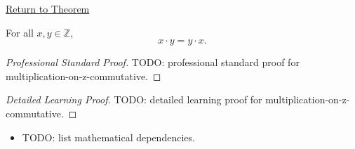 \newpage
{}
\label{prf:multiplication-on-z-commutative}

\begin{remark*}[Return]
\hyperref[thm:multiplication-on-z-commutative]{Return to Theorem}
\end{remark*}

\begin{theorem*}
For all $x,y\in\mathbb{Z}$,
\[
x\cdot y=y\cdot x.
\]
\end{theorem*}

\begin{proof}[Professional Standard Proof]
\LRAProofBodyStart
TODO: professional standard proof for multiplication-on-z-commutative.
\end{proof}

\begin{proof}[Detailed Learning Proof]
\LRAProofBodyStart
TODO: detailed learning proof for multiplication-on-z-commutative.
\end{proof}

\begin{remark*}
\end{remark*}

\begin{dependencies}
\begin{itemize}
  \item TODO: list mathematical dependencies.
\end{itemize}
\end{dependencies}

\clearpage

